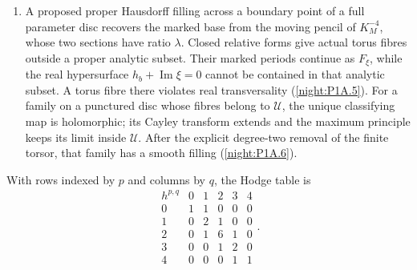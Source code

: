 \begin{enumerate}[label=\arabic*.]
  by the finite cap norm.  For the other, the actual based cusp
  correction acts on rays by $-P$, and takes $e_2$ to $(0,-1,1)$,
  outside the component's rays $\pm(\{0,1\}^3\setminus\{0\})$.
  The corresponding monomial map contracts a divisor, contradicting
  a biholomorphism (\cref{night:P1.17}).
\item A proposed proper Hausdorff filling across a boundary point of
  a full parameter disc recovers the marked base from the moving
  pencil of $K_M^{-4}$, whose two sections have ratio $\lambda$.
  Closed relative forms give actual torus fibres outside a proper
  analytic subset.  Their marked periods continue as $F_\xi$,
  while the real hypersurface $h_b+\operatorname{Im}\xi=0$
  cannot be contained in that analytic subset.  A torus fibre
  there violates real transversality (\cref{night:P1A.5}).  For a family on a punctured disc whose
  fibres belong to $\mathcal U$, the unique classifying map is
  holomorphic; its Cayley transform extends and the maximum principle
  keeps its limit inside $\mathcal U$.  After the explicit degree-two
  removal of the finite torsor, that family has a smooth filling
  (\cref{night:P1A.6}).
\end{enumerate}

With rows indexed by $p$ and columns by $q$, the Hodge table is
\[
\begin{array}{c|ccccc}
 h^{p,q}&0&1&2&3&4\\\hline
 0&1&1&0&0&0\\
 1&0&2&1&0&0\\
 2&0&1&6&1&0\\
 3&0&0&1&2&0\\
 4&0&0&0&1&1
\end{array}.
\]

